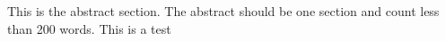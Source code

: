 This is the abstract section. The abstract should be one section and count less than 200 words. This is a test